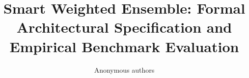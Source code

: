\title{\textbf{Smart Weighted Ensemble: Formal Architectural Specification and Empirical Benchmark Evaluation}}

\author{Anonymous authors}
